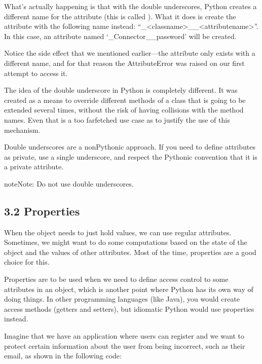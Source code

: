\documentclass[a4paper,10pt,english]{sphinxmanual}
\begin{document}
What’s actually happening is that with the double underscores, Python creates a different name for the attribute (this
is called ). What it does is create the attribute with the following name instead:
“\_\textless{}class\sphinxhyphen{}name\textgreater{}\_\_\textless{}attribute\sphinxhyphen{}name\textgreater{}”. In this case, an attribute named ‘\_Connector\_\_password’ will be created.

Notice the side effect that we mentioned earlier—the attribute only exists with a different name, and for that reason
the AttributeError was raised on our first attempt to access it.

The idea of the double underscore in Python is completely different. It was created as a means to override different
methods of a class that is going to be extended several times, without the risk of having collisions with the method
names. Even that is a too far\sphinxhyphen{}fetched use case as to justify the use of this mechanism.

Double underscores are a non\sphinxhyphen{}Pythonic approach. If you need to define attributes as private, use a single underscore,
and respect the Pythonic convention that it is a private attribute.

\begin{sphinxadmonition}{note}{Note:}
Do not use double underscores.
\end{sphinxadmonition}


\subsection{3.2 Properties}
\label{\detokenize{chapters/2_pythonic_code/index:properties}}
When the object needs to just hold values, we can use regular attributes. Sometimes, we might want to do some
computations based on the state of the object and the values of other attributes. Most of the time, properties are a
good choice for this.

Properties are to be used when we need to define access control to some attributes in an object, which is another point
where Python has its own way of doing things. In other programming languages (like Java), you would create access
methods (getters and setters), but idiomatic Python would use properties instead.

Imagine that we have an application where users can register and we want to protect certain information about the user
from being incorrect, such as their email, as shown in the following code:
\end{document}
